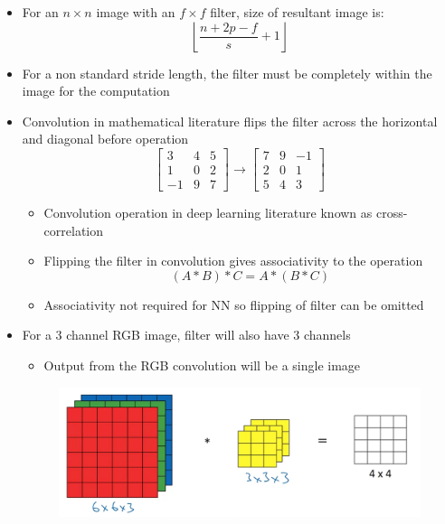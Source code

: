 \documentclass[12pt, letterpaper]{article}
\begin{document}
\begin{itemize}
\begin{itemize}
        \end{itemize}
        \item For an $n\times n$ image with an $f\times f$ filter, size of resultant image is:
        $$\left\lfloor\frac{n+2p-f}{s}+1\right\rfloor$$
        \item For a non standard stride length, the filter must be completely within the image for the computation
        \item Convolution in mathematical literature flips the filter across the horizontal and diagonal before operation
        $$\begin{bmatrix}
            3 & 4 & 5 \\
            1 & 0 & 2 \\
            -1 & 9 & 7
        \end{bmatrix}\rightarrow\begin{bmatrix}
            7 & 9 & -1 \\
            2 & 0 & 1 \\
            5 & 4 & 3
        \end{bmatrix}$$
        \begin{itemize}
            \item Convolution operation in deep learning literature known as cross-correlation
            \item Flipping the filter in convolution gives associativity to the operation
            $$(A*B)*C=A*(B*C)$$ 
            \item Associativity not required for NN so flipping of filter can be omitted
        \end{itemize}
        \item For a 3 channel RGB image, filter will also have 3 channels
        \begin{itemize}
            \item Output from the RGB convolution will be a single image
        \end{itemize}
        \begin{figure}[ht]
            \centering
            \includegraphics[width=15cm]{23.png}

\end{figure}
\end{itemize}
\end{document}
